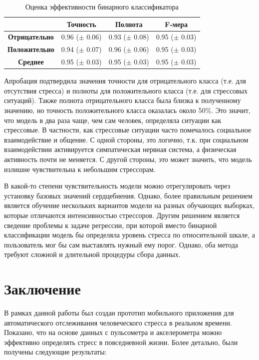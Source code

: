 \documentclass[14pt]{matmex-diploma-custom}
\begin{document}
\begin{table}[ht]
  \centering
  \caption{Оценка эффективности бинарного классификатора}
  \label{table:performance}
  \begin{tabular}{|c|c|c|c|}
    \hline
    & \textbf{Точность} & \textbf{Полнота} & \textbf{F-мера} \\ \hline
    \textbf{Отрицательно} & 0.96 ($\pm$ 0.06) & 0.93 ($\pm$ 0.08) & 0.95 ($\pm$ 0.03) \\ \hline
    \textbf{Положительно} & 0.94 ($\pm$ 0.07) & 0.96 ($\pm$ 0.06) & 0.95 ($\pm$ 0.03) \\ \hline
    \textbf{Среднее} & 0.95 ($\pm$ 0.03) & 0.95 ($\pm$ 0.03) & 0.95 ($\pm$ 0.03) \\ \hline
  \end{tabular}
\end{table}

Апробация подтвердила значения точности для отрицательного класса (т.е. для
отсутствия стресса) и полноты для положительного класса (т.е. для стрессовых
ситуаций). Также полнота отрицательного класса была близка к полученному
значению, но точность положительного класса оказалась около 50\%. Это значит,
что модель в два раза чаще, чем сам человек, определяла ситуации как стрессовые.
В частности, как стрессовые ситуации часто помечалось социальное взаимодействие
и общение. С одной стороны, это логично, т.к. при социальном взаимодействии
активируется симпатическая нервная система, а физическая активность почти не
меняется. С другой стороны, это может значить, что модель излишне чувствительна
к небольшим стрессорам.

В какой-то степени чувствительность модели можно отрегулировать через установку
базовых значений сердцебиения. Однако, более правильным решением является
обучение нескольких вариантов модели на разных обучающих выборках, которые
отличаются интенсивностью стрессоров. Другим решением является сведение проблемы
к задаче регрессии, при которой вместо бинарной классификации модель бы
определяла уровень стресса по относительной шкале, а пользователь мог бы сам
выставлять нужный ему порог. Однако, оба метода требуют сложной и длительной
процедуры сбора данных.

\section*{Заключение}
В рамках данной работы был создан прототип мобильного приложения для
автоматического отслеживания человеческого стресса в реальном времени. Показано,
что на основе данных с пульсометра и акселерометра можно эффективно определять
стресс в повседневной жизни. Более детально, были получены следующие результаты:
\end{document}
